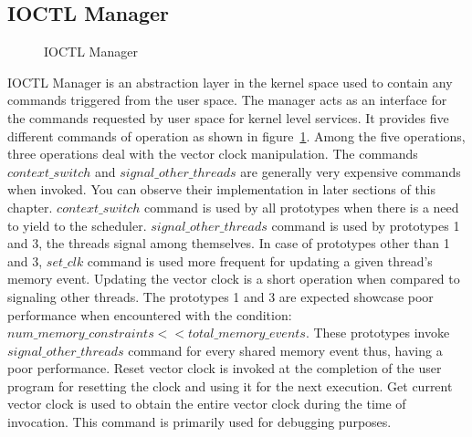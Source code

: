 \subsection{IOCTL Manager}

\begin{figure}[h]
\centering
{}
\caption{IOCTL Manager}
\label{ioctl_mgr}
\end{figure}
IOCTL Manager is an abstraction layer in the kernel space used to contain any commands triggered from the user space. 
The manager acts as an interface for the commands requested by user space for kernel level services. 
It provides five different commands of operation as shown in figure~\ref{ioctl_mgr}. 
Among the five operations, three operations deal with the vector clock manipulation. 
The commands $context\_switch$ and $signal\_other\_threads$ are generally very expensive commands when invoked. 
You can observe their implementation in later sections of this chapter. 
$context\_switch$ command is used by all prototypes when there is a need to yield to the scheduler. 
$signal\_other\_threads$ command is used by  prototypes 1 and 3, the threads signal among themselves. 
In case of prototypes other than 1 and 3, $set\_clk$ command is used more frequent for updating a given thread's memory event. 
Updating the vector clock is a short operation when compared to signaling other threads. 
The prototypes 1 and 3 are expected showcase poor performance when encountered with the condition: $num\_memory\_constraints << total\_memory\_events$. 
These prototypes invoke $signal\_other\_threads$ command for every shared memory event thus, having a poor performance. 
Reset vector clock is invoked at the completion of the user program for resetting the clock and using it for the next execution. 
Get current vector clock is used to obtain the entire vector clock during the time of invocation. 
This command is primarily used for debugging purposes. 


